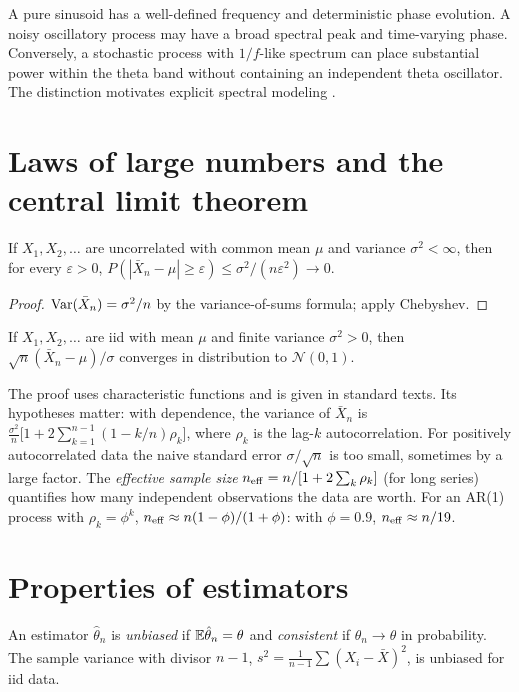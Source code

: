 \begin{workedexample}
A pure sinusoid has a well-defined frequency and deterministic phase evolution. A noisy oscillatory process may have a broad spectral peak and time-varying phase. Conversely, a stochastic process with $1/f$-like spectrum can place substantial power within the theta band without containing an independent theta oscillator. The distinction motivates explicit spectral modeling \cite{Donoghue2020,Gerster2022}.
\end{workedexample}
\section{Laws of large numbers and the central limit theorem}
\begin{theorem}
If $X_1,X_2,\ldots$ are uncorrelated with common mean $\mu$ and variance $\sigma^2<\infty$, then for every $\varepsilon>0$, $P(|\bar X_n-\mu|\ge\varepsilon)\le\sigma^2/(n\varepsilon^2)\to0$.
\end{theorem}
\begin{proof}
$\operatorname{Var}(\bar X_n)=\sigma^2/n$ by the variance-of-sums formula; apply Chebyshev.
\end{proof}

\begin{theorem}
If $X_1,X_2,\ldots$ are iid with mean $\mu$ and finite variance $\sigma^2>0$, then $\sqrt n(\bar X_n-\mu)/\sigma$ converges in distribution to $\mathcal N(0,1)$.
\end{theorem}
The proof uses characteristic functions and is given in standard texts. Its hypotheses matter: with dependence, the variance of $\bar X_n$ is $\frac{\sigma^2}n\bigl[1+2\sum_{k=1}^{n-1}(1-k/n)\rho_k\bigr]$, where $\rho_k$ is the lag-$k$ autocorrelation. For positively autocorrelated data the naive standard error $\sigma/\sqrt n$ is too small, sometimes by a large factor. The \emph{effective sample size} $n_{\rm eff}=n/[1+2\sum_k\rho_k]$ (for long series) quantifies how many independent observations the data are worth. For an AR(1) process with $\rho_k=\phi^k$, $n_{\rm eff}\approx n(1-\phi)/(1+\phi)$: with $\phi=0.9$, $n_{\rm eff}\approx n/19$.

\section{Properties of estimators}
An estimator $\hat\theta_n$ is \emph{unbiased} if $\mathbb E\hat\theta_n=\theta$ and \emph{consistent} if $\hat\theta_n\to\theta$ in probability. The sample variance with divisor $n-1$, $s^2=\frac1{n-1}\sum(X_i-\bar X)^2$, is unbiased for iid data.

